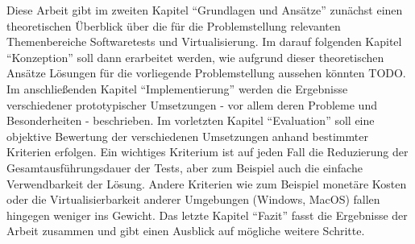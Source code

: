Diese Arbeit gibt im zweiten Kapitel "`Grundlagen und Ansätze"' zunächst einen theoretischen Überblick über die für die Problemstellung relevanten Themenbereiche Softwaretests und Virtualisierung. Im darauf folgenden Kapitel "`Konzeption"' soll dann erarbeitet werden, wie aufgrund dieser theoretischen Ansätze Lösungen für die vorliegende Problemstellung aussehen könnten TODO. Im anschließenden Kapitel "`Implementierung"' werden die Ergebnisse verschiedener prototypischer Umsetzungen - vor allem deren Probleme und Besonderheiten - beschrieben. Im vorletzten Kapitel "`Evaluation"' soll eine objektive Bewertung der verschiedenen Umsetzungen anhand bestimmter Kriterien erfolgen. Ein wichtiges Kriterium ist auf jeden Fall die Reduzierung der Gesamtausführungsdauer der Tests, aber zum Beispiel auch die einfache Verwendbarkeit der Lösung. Andere Kriterien wie zum Beispiel monetäre Kosten oder die Virtualisierbarkeit anderer Umgebungen (Windows, MacOS) fallen hingegen weniger ins Gewicht. Das letzte Kapitel "`Fazit"' fasst die Ergebnisse der Arbeit zusammen und gibt einen Ausblick auf mögliche weitere Schritte.

